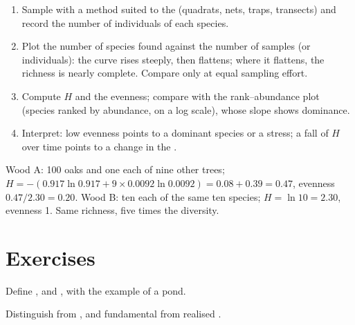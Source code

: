 \begin{method}\label{met:b1:ecosystem-organization:sampling}
\begin{enumerate}
  \item Sample with a method suited to the  (quadrats, nets,
        traps, transects) and record the number of individuals of each
        species.
  \item Plot the number of species found against the number of
        samples (or individuals): the curve rises steeply, then
        flattens; where it flattens, the richness is nearly complete.
        Compare  only at equal sampling effort.
  \item Compute $H$ and the evenness; compare with the rank--abundance
        plot (species ranked by abundance, on a log scale), whose
        slope shows dominance.
  \item Interpret: low evenness points to a dominant species or a
        stress; a fall of $H$ over time points to a change in the
        .
\end{enumerate}
\end{method}

\begin{example}\label{ex:b1:ecosystem-organization:twowoods}
Wood A: 100 oaks and one each of nine other trees; $H = -(0.917\ln
0.917 + 9\times 0.0092\ln 0.0092) = 0.08 + 0.39 = 0.47$, evenness
$0.47/2.30 = 0.20$. Wood B: ten each of the same ten species; $H =
\ln 10 = 2.30$, evenness 1. Same richness, five times the diversity.
\end{example}

\section{Exercises}

\begin{exercise}[$\star$]\label{exo:b1:ecosystem-organization:1}
Define ,  and , with the example of a pond.
\end{exercise}

\begin{exercise}[$\star$]\label{exo:b1:ecosystem-organization:2}
Distinguish  from , and fundamental from realised .
\end{exercise}

